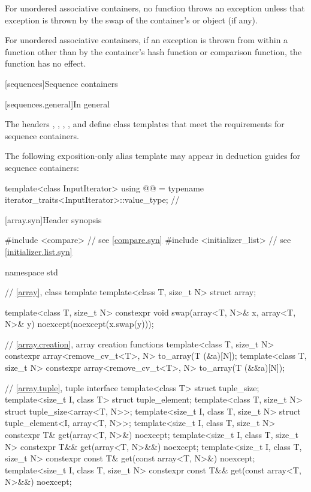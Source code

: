 \pnum
For unordered associative containers, no  function throws
an exception unless that exception is thrown by the swap of the container's
 or  object (if any).

\pnum
{}%
%
For unordered associative containers, if an exception is thrown
from within a  function other than by the container's hash
function or comparison function, the  function has no effect.

[sequences]{Sequence containers}

[sequences.general]{In general}

\pnum
The headers
,
,
,
, and
define class templates that meet the requirements for sequence containers.

\pnum
The following exposition-only alias template may appear in deduction guides for sequence containers:

\begin{codeblock}
template<class InputIterator>
  using @@ = typename iterator_traits<InputIterator>::value_type;  // \expos
\end{codeblock}

[array.syn]{Header  synopsis}

%
\begin{codeblock}
#include <compare>              // see \ref{compare.syn}
#include <initializer_list>     // see \ref{initializer.list.syn}

namespace std {
  // \ref{array}, class template 
  template<class T, size_t N> struct array;

  template<class T, size_t N>
    constexpr void swap(array<T, N>& x, array<T, N>& y) noexcept(noexcept(x.swap(y)));

  // \ref{array.creation}, array creation functions
  template<class T, size_t N>
    constexpr array<remove_cv_t<T>, N> to_array(T (&a)[N]);
  template<class T, size_t N>
    constexpr array<remove_cv_t<T>, N> to_array(T (&&a)[N]);

  // \ref{array.tuple}, tuple interface
  template<class T> struct tuple_size;
  template<size_t I, class T> struct tuple_element;
  template<class T, size_t N>
    struct tuple_size<array<T, N>>;
  template<size_t I, class T, size_t N>
    struct tuple_element<I, array<T, N>>;
  template<size_t I, class T, size_t N>
    constexpr T& get(array<T, N>&) noexcept;
  template<size_t I, class T, size_t N>
    constexpr T&& get(array<T, N>&&) noexcept;
  template<size_t I, class T, size_t N>
    constexpr const T& get(const array<T, N>&) noexcept;
  template<size_t I, class T, size_t N>
    constexpr const T&& get(const array<T, N>&&) noexcept;
}
\end{codeblock}

